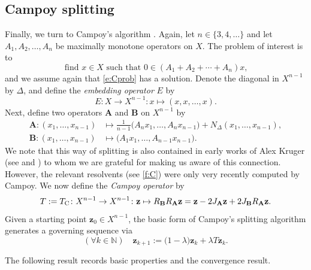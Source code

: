 \documentclass[11pt]{article}
\newcommand{\bz}{\ensuremath{\mathbf{z}}}
\newcommand{\kkk}{\ensuremath{{k\in{\mathbb N}}}}
\newcommand{\tc}{\ensuremath{T_{\text{\scriptsize C}}}}
\newcommand{\bA}{\ensuremath{{\mathbf{A}}}}
\newcommand{\bB}{\ensuremath{{\mathbf{B}}}}
\theoremstyle{definition}
\begin{document}
{\subsection{Campoy splitting}
\label{ss:Csplit}
Finally, we turn to Campoy's algorithm \cite{Campoy}. 
Again, let $n\in\{3,4,\ldots\}$ and 
let $A_1,A_2,\ldots,A_n$ 
be maximally monotone operators on  $X$. 
The problem of interest is to 
\begin{equation}
\label{e:Cprob}
\text{find $x\in X$ such that $0\in (A_1+A_2+\cdots + A_n)x$,}
\end{equation}
and we assume again that \cref{e:Cprob} has a solution. 
Denote the diagonal in $X^{n-1}$ by $\Delta$, and define
the \emph{embedding operator} $E$ by 
\begin{equation}
\label{e:embed}
E\colon X\to X^{n-1}\colon x\mapsto (x,x,\ldots,x).
\end{equation}
Next, define two operators $\bA$ and $\bB$ on $X^{n-1}$ by
\begin{align*}
\bA\colon (x_1,\ldots,x_{n-1}) &\mapsto \tfrac{1}{n-1}\big(A_nx_1,\ldots,A_nx_{n-1}\big) + N_{\Delta}(x_1,\ldots ,x_{n-1}),\\
\bB\colon (x_1,\ldots,x_{n-1}) &\mapsto \big(A_1x_1,\ldots,A_{n-1}x_{n-1}\big).
\end{align*}
We note that this way of splitting is also contained 
in early works of Alex Kruger
(see \cite{Kruger81} and \cite{Kruger85}) to whom we are grateful for making
us aware of this connection. However, the relevant resolvents (see \cref{f:C}) were only
very recently computed by Campoy. 
We now define the \emph{Campoy operator} by 
\begin{equation}
\label{e:CT}
T := \tc \colon X^{n-1}\to X^{n-1}\colon 
\bz\mapsto 
R_{\bB}R_{\bA}\bz = \bz - 2J_{\bA}\bz + 2J_{\bB}R_{\bA}\bz. 
\end{equation}
Given a starting point $\bz_0 \in X^{n-1}$, 
the basic form of 
Campoy's splitting algorithm generates a
governing sequence via
\begin{equation}
\label{e:basicC}
(\forall \kkk)\quad \bz_{k+1} := 
(1-{\lambda}\big)\bz_{k} + {\lambda} T\bz_k. 
\end{equation}

The following result records basic properties and the convergence result. 

}
\end{document}
